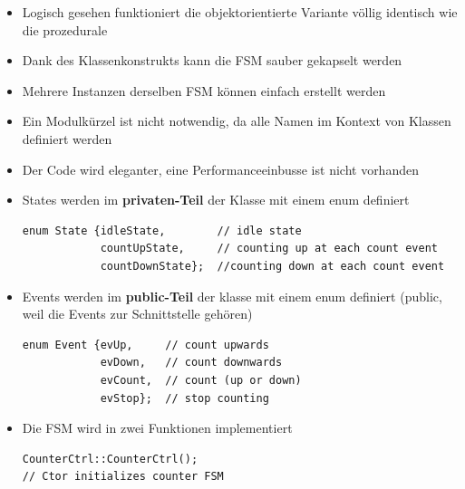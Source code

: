\begin{itemize}
  \item Logisch gesehen funktioniert die objektorientierte Variante völlig
  identisch wie die prozedurale
  \item Dank des Klassenkonstrukts kann die FSM sauber gekapselt werden
  \item Mehrere Instanzen derselben FSM können einfach erstellt werden
  \item Ein Modulkürzel ist nicht notwendig, da alle Namen im Kontext von
  Klassen definiert werden
  \item Der Code wird eleganter, eine Performanceeinbusse ist nicht vorhanden
  \item States werden im \textbf{privaten-Teil} der Klasse mit einem enum
  definiert
\begin{lstlisting}[style=Cpp]
enum State {idleState,        // idle state 
            countUpState,     // counting up at each count event 
            countDownState};  //counting down at each count event
\end{lstlisting}
\item Events werden im \textbf{public-Teil} der klasse mit einem enum definiert
(public, weil die Events zur Schnittstelle gehören)
\begin{lstlisting}[style=Cpp]
enum Event {evUp,     // count upwards
            evDown,   // count downwards 
            evCount,  // count (up or down)
            evStop};  // stop counting
\end{lstlisting}
\item Die FSM wird in zwei Funktionen implementiert
\begin{lstlisting}[style=Cpp]
CounterCtrl::CounterCtrl(); 
// Ctor initializes counter FSM


\end{lstlisting}
\end{itemize}
